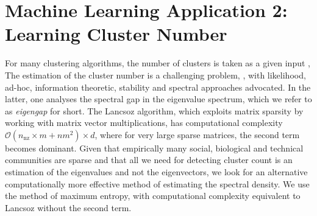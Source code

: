 \documentclass[letterpaper]{article} %
\begin{document}
\section{Machine Learning Application 2: Learning Cluster Number}
For many clustering algorithms, the number of clusters is taken as a given input 
\cite{liu2013large},\cite{cucuringu2016simple}
The estimation of the cluster number is a challenging problem, \citep{von2007tutorial}, with likelihood, ad-hoc, information theoretic, stability and spectral approaches advocated. In the latter, one analyses the spectral gap in the eigenvalue spectrum, which we refer to as \emph{eigengap} for short. %
The Lancsoz algorithm, which exploits matrix sparsity by working with matrix vector multiplications,  has computational complexity $\mathcal{O}(n_\mathrm{nz}\times m + nm^{2})\times d$, where for very large sparse matrices, the second term becomes dominant. Given that empirically many social, biological and technical communities are sparse and that all we need for detecting cluster count is an estimation of the eigenvalues and not the eigenvectors, we look for an alternative computationally more effective method of estimating the spectral density. We use the method of maximum entropy, with computational complexity equivalent to Lancsoz without the second term. 
\end{document}
